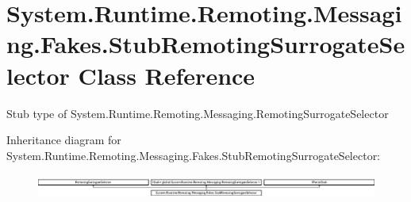 \hypertarget{class_system_1_1_runtime_1_1_remoting_1_1_messaging_1_1_fakes_1_1_stub_remoting_surrogate_selector}{\section{System.\-Runtime.\-Remoting.\-Messaging.\-Fakes.\-Stub\-Remoting\-Surrogate\-Selector Class Reference}
\label{class_system_1_1_runtime_1_1_remoting_1_1_messaging_1_1_fakes_1_1_stub_remoting_surrogate_selector}
}


Stub type of System.\-Runtime.\-Remoting.\-Messaging.\-Remoting\-Surrogate\-Selector 


Inheritance diagram for System.\-Runtime.\-Remoting.\-Messaging.\-Fakes.\-Stub\-Remoting\-Surrogate\-Selector\-:\begin{figure}[H]
\begin{center}
\leavevmode
\includegraphics[height=0.784314cm]{class_system_1_1_runtime_1_1_remoting_1_1_messaging_1_1_fakes_1_1_stub_remoting_surrogate_selector}
\end{center}
\end{figure}
